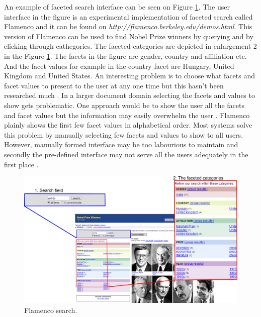 \documentclass{sigchi}
\begin{document}
An example of faceted search interface can be seen on Figure \ref{flamenco}. The user interface in the figure is an experimental implementation of faceted search called Flamenco and it can be found on \textit{http://flamenco.berkeley.edu/demos.html}. This version of Flamenco can be used to find Nobel Prize winners by querying and by clicking through cathegories. The faceted categories are depicted in enlargement 2 in the Figure \ref{flamenco}. The facets in the figure are gender, country and affiliation etc. And the facet values for example in the country facet are Hungary, United Kingdom and United States. An interesting problem is to choose what facets and facet values to present to the user at any one time but this hasn't been researched much \cite{koren08}. In a larger document domain selecting the facets and values to show gets problematic. One approach would be to show the user all the facets and facet values but the information may easily overwhelm the user \cite{koren08}. Flamenco plainly shows the first few facet values in alphabetical order. Most systems solve this problem by manually selecting few facets and values to show to all users. However, manually formed interface may be too labourious to maintain and secondly the pre-defined interface may not serve all the users adequately in the first place \cite{koren08}.  

\begin{figure}[htp] %
\caption{ Flamenco search.} \label{flamenco}
\vspace{5pt}
\includegraphics[scale=0.18]{figures/flamenco.pdf} 
\end{figure}
\end{document}

